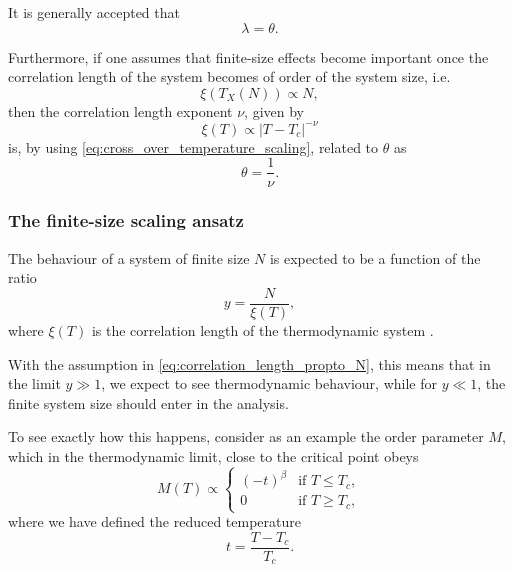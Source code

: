 It is generally accepted that \cite{barber1983finite}
\begin{equation}
  \lambda = \theta.
\end{equation}

Furthermore, if one assumes that finite-size effects become important once the correlation length of the system becomes of order of the system size, i.e. \cite{fisher1967interfacial}
\begin{equation}\label{eq:correlation_length_propto_N}
  \xi(T_X(N)) \propto N,
\end{equation}
then the correlation length exponent $\nu$, given by
\begin{equation}
  \xi(T) \propto |T - T_c|^{-\nu}
\end{equation}
is, by using \autoref{eq:cross_over_temperature_scaling}, related to $\theta$ as
\begin{equation}
  \theta = \frac{1}{\nu}.
\end{equation}

\subsubsection{The finite-size scaling ansatz}

The behaviour of a system of finite size $N$ is expected to be a function of the ratio
\begin{equation}
  y = \frac{N}{\xi(T)},
\end{equation}
where $\xi(T)$ is the correlation length of the thermodynamic system \cite{fisher1972scaling}.

With the assumption in \autoref{eq:correlation_length_propto_N}, this means that in the limit $y \gg 1$,
we expect to see thermodynamic behaviour, while for $y \ll 1$,
the finite system size should enter in the analysis.

To see exactly how this happens, consider as an example the order parameter $M$,
which in the thermodynamic limit, close to the critical point obeys
\begin{equation}
  M(T) \propto
  \begin{cases}
    (-t)^{\beta} & \text{if } T \leq T_c, \\
    0 & \text{if } T \geq T_c,
  \end{cases}
\end{equation}
where we have defined the reduced temperature
\begin{equation}
  t = \frac{T - T_c}{T_c}.
\end{equation}


